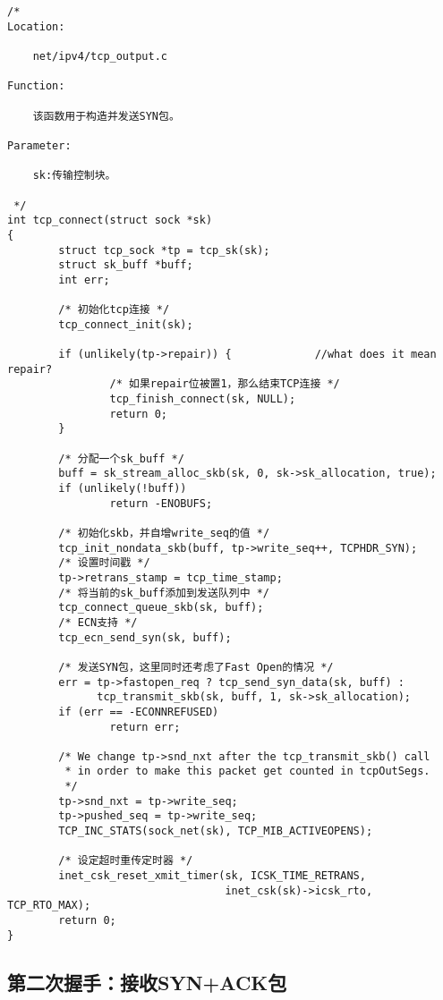 \begin{verbatim}
/* 
Location:

	net/ipv4/tcp_output.c

Function:

	该函数用于构造并发送SYN包。

Parameter:

	sk:传输控制块。

 */
int tcp_connect(struct sock *sk)
{
        struct tcp_sock *tp = tcp_sk(sk);
        struct sk_buff *buff;
        int err;

        /* 初始化tcp连接 */
        tcp_connect_init(sk);

        if (unlikely(tp->repair)) {				//what does it mean repair?
                /* 如果repair位被置1，那么结束TCP连接 */
                tcp_finish_connect(sk, NULL);
                return 0;
        }

        /* 分配一个sk_buff */
        buff = sk_stream_alloc_skb(sk, 0, sk->sk_allocation, true);
        if (unlikely(!buff))
                return -ENOBUFS;

        /* 初始化skb，并自增write_seq的值 */
        tcp_init_nondata_skb(buff, tp->write_seq++, TCPHDR_SYN);
        /* 设置时间戳 */
        tp->retrans_stamp = tcp_time_stamp;
        /* 将当前的sk_buff添加到发送队列中 */
        tcp_connect_queue_skb(sk, buff);
        /* ECN支持 */
        tcp_ecn_send_syn(sk, buff);

        /* 发送SYN包，这里同时还考虑了Fast Open的情况 */
        err = tp->fastopen_req ? tcp_send_syn_data(sk, buff) :
              tcp_transmit_skb(sk, buff, 1, sk->sk_allocation);
        if (err == -ECONNREFUSED)
                return err;

        /* We change tp->snd_nxt after the tcp_transmit_skb() call
         * in order to make this packet get counted in tcpOutSegs.
         */
        tp->snd_nxt = tp->write_seq;
        tp->pushed_seq = tp->write_seq;
        TCP_INC_STATS(sock_net(sk), TCP_MIB_ACTIVEOPENS);

        /* 设定超时重传定时器 */
        inet_csk_reset_xmit_timer(sk, ICSK_TIME_RETRANS,
                                  inet_csk(sk)->icsk_rto, TCP_RTO_MAX);
        return 0;
}
\end{verbatim}

\subsection{第二次握手：接收SYN+ACK包}
\label{subsec:recv_synack}

